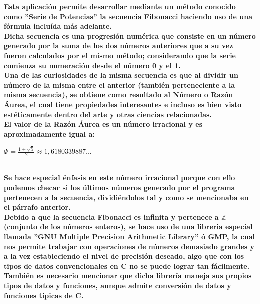 \documentclass[letterpaper]{article}
\begin{document}
\begin{flushleft}
\textbf{\Large Esta aplicaci\'on permite desarrollar mediante un m\'etodo conocido como ''Serie de Potencias'' la secuencia Fibonacci haciendo uso de una f\'ormula inclu\'ida m\'as adelante.\\}
\vspace{0.5cm}
\textbf{\Large Dicha secuencia es una progresi\'on num\'erica que consiste en un n\'umero generado por la suma de los dos n\'umeros anteriores que a su vez fueron calculados por el mismo m\'etodo; considerando que la serie comienza su numeraci\'on desde el n\'umero 0 y el 1.\\}
\vspace{0.5cm}
\textbf{\Large Una de las curiosidades de la misma secuencia es que al dividir un n\'umero de la misma entre el anterior (tambi\'en perteneciente a la misma secuencia), se obtiene como resultado al N\'umero o Raz\'on \'Aurea, el cual tiene propiedades interesantes e incluso es bien visto est\'eticamente dentro del arte y otras ciencias relacionadas.\\}
\vspace{0.5cm}
\textbf{\Large El valor de la Raz\'on \'Aurea es un n\'umero irracional y es aproximadamente igual a:\\}
\begin{center}
\vspace{0.5cm}
\textbf{\huge $\Phi = \frac{1 + \sqrt{5}}{2} \approx 1,6180339887...$}
\end{center}
\textbf{\Large \\Se hace especial \'enfasis en este n\'umero irracional porque con ello podemos checar si los \'ultimos n\'umeros generado por el programa pertenecen a la secuencia, dividi\'endolos tal y como se mencionaba en el p\'arrafo anterior.\\}
\vspace{0.5cm}
\textbf{\Large Debido a que la secuencia Fibonacci es infinita y pertenece a $\mathbb{Z}$ (conjunto de los n\'umeros enteros), se hace uso de una libreria especial llamada ''GNU Multiple Precision Arithmetic Library'' \'o GMP, la cual nos permite trabajar con operaciones de n\'umeros demasiado grandes y a la vez estableciendo el nivel de precisi\'on deseado, algo que con los tipos de datos convencionales en C no se puede lograr tan f\'acilmente. Tambi\'en es necesario mencionar que dicha librer\'ia maneja sus propios tipos de datos y funciones, aunque admite conversi\'on de datos y funciones t\'ipicas de C.\\}
\end{flushleft}
\end{document}
